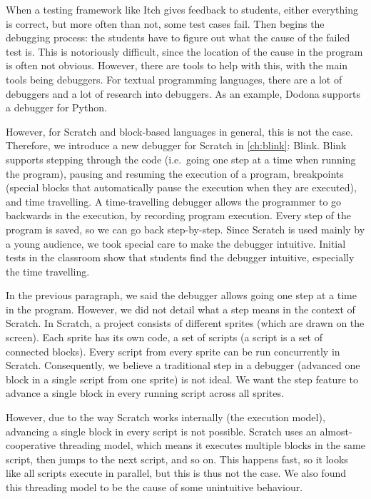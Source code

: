 \documentclass[main]{subfiles}
\begin{document}
When a testing framework like Itch gives feedback to students, either everything is correct, but more often than not, some test cases fail.
Then begins the debugging process: the students have to figure out what the cause of the failed test is.
This is notoriously difficult, since the location of the cause in the program is often not obvious.
However, there are tools to help with this, with the main tools being debuggers.
For textual programming languages, there are a lot of debuggers and a lot of research into debuggers.
As an example, Dodona supports a debugger for Python.

However, for Scratch and block-based languages in general, this is not the case.
Therefore, we introduce a new debugger for Scratch in \cref{ch:blink}: Blink.
Blink supports stepping through the code (i.e.\ going one step at a time when running the program), pausing and resuming the execution of a program, breakpoints (special blocks that automatically pause the execution when they are executed), and time travelling.
A time-travelling debugger allows the programmer to go backwards in the execution, by recording program execution.
Every step of the program is saved, so we can go back step-by-step.
Since Scratch is used mainly by a young audience, we took special care to make the debugger intuitive.
Initial tests in the classroom show that students find the debugger intuitive, especially the time travelling.

In the previous paragraph, we said the debugger allows going one step at a time in the program.
However, we did not detail what a step means in the context of Scratch.
In Scratch, a project consists of different sprites (which are drawn on the screen).
Each sprite has its own code, a set of scripts (a script is a set of connected blocks).
Every script from every sprite can be run concurrently in Scratch.
Consequently, we believe a traditional step in a debugger (advanced one block in a single script from one sprite) is not ideal.
We want the step feature to advance a single block in every running script across all sprites.

However, due to the way Scratch works internally (the execution model), advancing a single block in every script is not possible.
Scratch uses an almost-cooperative threading model, which means it executes multiple blocks in the same script, then jumps to the next script, and so on.
This happens fast, so it looks like all scripts execute in parallel, but this is thus not the case.
We also found this threading model to be the cause of some unintuitive behaviour.
\end{document}
